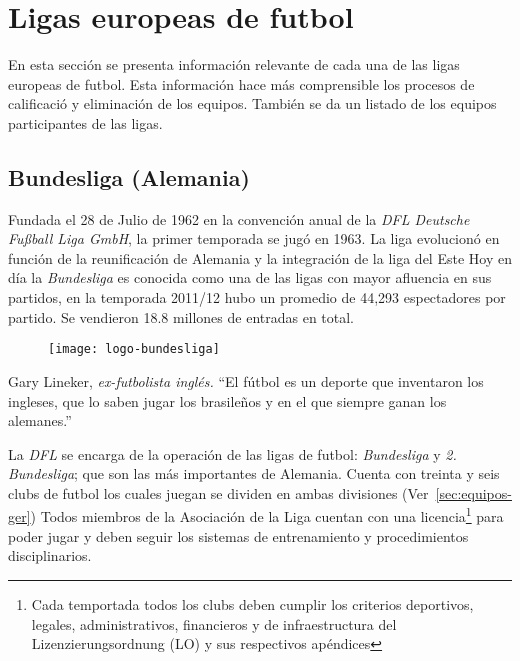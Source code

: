 \graphicspath{{/Users/brunomedina/Dropbox/Tesis-Egobets/egobets-notas/resources/marco/}}

\chapter{Ligas europeas de futbol}\label{chap:equipos}
En esta sección se presenta información relevante de cada una de las ligas europeas de futbol. Esta información hace más comprensible los procesos de calificació y eliminación de los equipos. También se da un listado de los equipos participantes de las ligas.


\section{Bundesliga (Alemania)}


Fundada el 28 de Julio de 1962 en la convención anual de la \emph{DFL Deutsche Fußball Liga GmbH}, la primer temporada se jugó en 1963. La liga evolucionó en función de la reunificación de Alemania y la integración de la liga del Este \cite{hesse2003tor} Hoy en día la \emph{Bundesliga} es conocida como una de las ligas con mayor afluencia en sus partidos, en la temporada 2011/12 hubo un promedio de 44,293 espectadores por partido. Se vendieron 18.8 millones de entradas en total.

\begin{figure}[!htb]\centering
   \begin {minipage}{0.4\textwidth}
     \texttt{[image: logo-bundesliga]}
   \end{minipage}
\end{figure}
\begin{chapquote}{Gary Lineker, \textit{ex-futbolista inglés.}}
	``El fútbol es un deporte que inventaron los ingleses, que lo saben jugar los brasileños y en el que siempre ganan los alemanes.''
\end{chapquote}


La \emph{DFL} se encarga de la operación de las ligas de futbol: \emph{Bundesliga} y \emph{2. Bundesliga}; que son las más importantes de Alemania. Cuenta con treinta y seis clubs de futbol los cuales juegan se dividen en ambas divisiones (Ver~\ref{sec:equipos-ger}) Todos miembros de la Asociación  de la Liga cuentan con una licencia\footnote{Cada temportada todos los clubs deben cumplir los criterios deportivos, legales, administrativos, financieros y de infraestructura del Lizenzierungsordnung (LO) y sus respectivos apéndices} para poder jugar y deben seguir los sistemas de entrenamiento y procedimientos disciplinarios.

